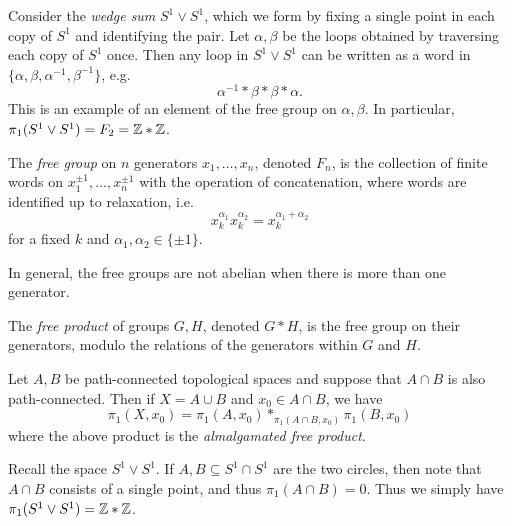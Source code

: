 \begin{example}
  Consider the \emph{wedge sum} $S^1 \lor S^1$,
  which we form by fixing a single point in each
  copy of $S^1$ and identifying the pair. Let $\alpha, \beta$
  be the loops obtained by traversing each copy of
  $S^1$ once. Then any loop in
  $S^1 \lor S^1$ can be written as a word in
  $\{\alpha, \beta, \alpha^{-1}, \beta^{-1}\}$, e.g.
  \[
    \alpha^{-1} * \beta * \beta * \alpha.
  \]
  This is an example of an element of the
  free group on $\alpha, \beta$. In particular,
  $\pi_1(S^1 \lor S^1) = F_2 = \mathbb{Z} * \mathbb{Z}$.
\end{example}

\begin{definition}
  The \emph{free group} on $n$ generators
  $x_1, \dots, x_n$, denoted $F_n$, is the collection
  of finite words on $x_1^{\pm 1}, \dots, x_n^{\pm 1}$
  with the operation of concatenation, where
  words are identified up to relaxation, i.e.
  \[
    x_k^{\alpha_1} x_k^{\alpha_2} = x_k^{\alpha_1 + \alpha_2}
  \]
  for a fixed $k$ and $\alpha_1, \alpha_2 \in \{\pm 1\}$.
\end{definition}

\begin{remark}
  In general, the free groups
  are not abelian when there is more than one
  generator.
\end{remark}

\begin{definition}
  The \emph{free product} of groups $G, H$, denoted
  $G * H$, is the free group on their generators,
  modulo the relations of the generators within
  $G$ and $H$.
\end{definition}

\begin{theorem}
  Let $A, B$ be path-connected topological spaces
  and suppose that $A \cap B$ is also path-connected.
  Then if $X = A \cup B$ and $x_0 \in A \cap B$,
  we have
  \[
    \pi_1(X, x_0) = 
    \pi_1(A, x_0) *_{\pi_1(A \cap B, x_0)} \pi_1(B, x_0)
  \]
  where the above product is the
  \emph{almalgamated free product}.
\end{theorem}

\begin{example}
  Recall the space $S^1 \lor S^1$. If
  $A, B \subseteq S^1 \cap S^1$ are the
  two circles, then note that
  $A \cap B$ consists of a single point, and
  thus $\pi_1(A \cap B) = 0$. Thus
  we simply have $\pi_1(S^1 \lor S^1) = \mathbb{Z} * \mathbb{Z}$.
\end{example}

